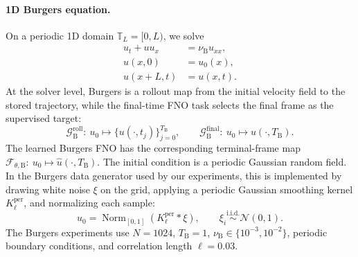 \documentclass[letterpaper]{article} %
\begin{document}
\paragraph{1D Burgers equation.}
On a periodic 1D domain $\mathbb{T}_L=[0,L)$, we solve
\begin{align}
  u_t + u u_x
  &=
  \nu_{\mathrm{B}} u_{xx},
  \nonumber\\
  u(x,0)&=u_0(x),
  \nonumber\\
  u(x+L,t)&=u(x,t).
\end{align}
At the solver level, Burgers is a rollout map from the initial velocity field to
the stored trajectory, while the final-time FNO task selects the final frame as
the supervised target:
\begin{equation}
  \mathcal{G}_{\mathrm{B}}^{\mathrm{roll}}:\ u_0
  \mapsto
  \{u(\cdot,t_j)\}_{j=0}^{T_{\mathrm{B}}},
  \qquad
  \mathcal{G}_{\mathrm{B}}^{\mathrm{final}}:\ u_0
  \mapsto u(\cdot,T_{\mathrm{B}}).
\end{equation}
The learned Burgers FNO has the corresponding terminal-frame map
$\mathcal F_{\theta,\mathrm{B}}:\ u_0\mapsto
\widehat u(\cdot,T_{\mathrm{B}})$.
The initial condition is a periodic Gaussian random field. In the Burgers data
generator used by our experiments, this is implemented by drawing white noise
$\xi$ on the grid, applying a periodic Gaussian smoothing kernel
$K^{\mathrm{per}}_\ell$, and normalizing each sample:
\begin{equation}
  u_0
  =
  \operatorname{Norm}_{[0,1]}
  \!\left(K^{\mathrm{per}}_\ell * \xi\right),
  \qquad
  \xi_i\overset{\mathrm{i.i.d.}}{\sim}\mathcal{N}(0,1).
\end{equation}
The Burgers experiments use $N=1024$, $T_{\mathrm{B}}=1$,
$\nu_{\mathrm{B}}\in\{10^{-3},10^{-2}\}$, periodic boundary conditions, and
correlation length $\ell=0.03$.
\end{document}
